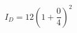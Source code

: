 \documentclass[preview]{standalone}
\begin{document}
\begin{align*}
I_D = 12 ( 1+\dfrac{0}{4} )^2
\end{align*}
\end{document}
